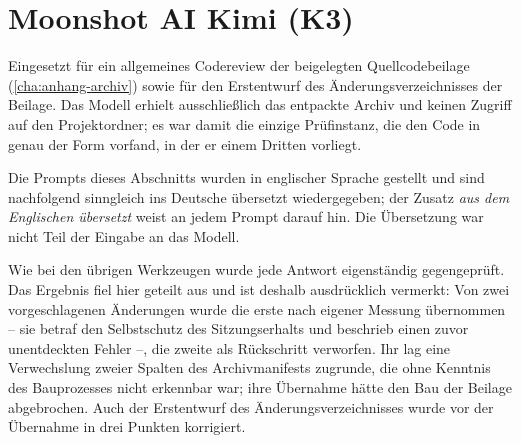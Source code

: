 %
%

\section{Moonshot AI Kimi (K3)}
\label{sec:prompts-kimi}

\nocite{moonshotKimi2026}

Eingesetzt für ein allgemeines Codereview der beigelegten Quellcodebeilage
(\cref{cha:anhang-archiv}) sowie für den Erstentwurf des
Änderungsverzeichnisses der Beilage. Das Modell erhielt ausschließlich das
entpackte Archiv und keinen Zugriff auf den Projektordner; es war damit die
einzige Prüfinstanz, die den Code in genau der Form vorfand, in der er einem
Dritten vorliegt.

Die Prompts dieses Abschnitts wurden in englischer Sprache gestellt und sind
nachfolgend sinngleich ins Deutsche übersetzt wiedergegeben; der Zusatz
\textit{aus dem Englischen übersetzt} weist an jedem Prompt darauf hin. Die
Übersetzung war nicht Teil der Eingabe an das Modell.

Wie bei den übrigen Werkzeugen wurde jede Antwort eigenständig gegengeprüft.
Das Ergebnis fiel hier geteilt aus und ist deshalb ausdrücklich vermerkt: Von
zwei vorgeschlagenen Änderungen wurde die erste nach eigener Messung
übernommen -- sie betraf den Selbstschutz des Sitzungserhalts und beschrieb
einen zuvor unentdeckten Fehler --, die zweite als Rückschritt verworfen. Ihr
lag eine Verwechslung zweier Spalten des Archivmanifests zugrunde, die ohne
Kenntnis des Bauprozesses nicht erkennbar war; ihre Übernahme hätte den Bau
der Beilage abgebrochen. Auch der Erstentwurf des Änderungsverzeichnisses
wurde vor der Übernahme in drei Punkten korrigiert.

